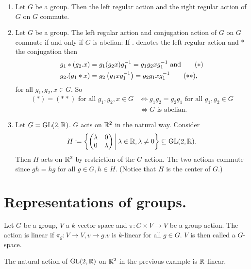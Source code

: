 \begin{expls}
 \begin{enumerate}[label=\emph{\alph*)},leftmargin=*]
  \item
   Let $G$ be a group. Then the left regular action and the right regular action of $G$ on $G$ commute.
  \item
   Let $G$ be a group. The left regular action and conjugation action of $G$ on $G$ commute if and only if $G$ is abelian: If $.$ denotes the left regular action and $*$ the conjugation then
   \begin{align*}
    g_1*(g_2.x) &= g_1 (g_2 x) g_1^{-1} = g_1 g_2 x g_1^{-1} \text{ and} \tag{\ensuremath{\ast}}\\
    g_2.(g_1*x) &= g_2 \left(g_1 x g_1^{-1}\right) = g_2 g_1 x g_1^{-1} \tag{\ensuremath{\ast\ast}},
   \end{align*}
   for all $g_1, g_2, x \in G$. So
   \begin{align*}
    (\ast) = (\ast\ast) \text{ for all } g_1, g_2, x \in G
    &\Leftrightarrow g_1 g_2 = g_2 g_1 \text{ for all } g_1, g_2 \in G \\
    &\Leftrightarrow \text{$G$ is abelian}.
   \end{align*}
  \item
   Let $G = \operatorname{GL}(2,\mathbb{R})$. $G$ acts on $\mathbb{R}^2$ in the natural way. Consider
   \[
    H \coloneqq \left\{ \begin{pmatrix}\lambda&0\\0&\lambda\end{pmatrix} \,\middle|\, \lambda \in \mathbb{R}, \lambda \neq 0 \right\} \subseteq \operatorname{GL}(2,\mathbb{R}).
   \]
   Then $H$ acts on $\mathbb{R}^2$ by restriction of the $G$-action. The two actions commute since $gh = hg$ for all $g \in G, h \in H$. (Notice that $H$ is the center of $G$.)
 \end{enumerate}
\end{expls}





\section{Representations of groups.}


\begin{defi}
 Let $G$ be a group, $V$ a $k$-vector space and $\pi \colon G \times V \to V$ be a group action. The action is linear if $\pi_g \colon V \to V, v \mapsto g.v$ is $k$-linear for all $g \in G$. $V$ is then called a $G$-space.
\end{defi}


\begin{expl}
 The natural action of $\operatorname{GL}(2,\mathbb{R})$ on $\mathbb{R}^2$ in the previous example is $\mathbb{R}$-linear.
\end{expl}


